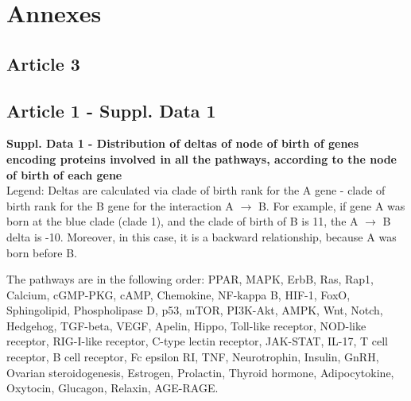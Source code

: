 \chapter[Annexes]{Annexes}
\thispagestyle{firstpage}

\minitoc
\newpage

\section{Article 3}\label{article3}


\section{Article 1 - Suppl. Data 1}
\textbf{Suppl. Data 1 - Distribution of deltas of node of birth of genes encoding proteins involved in all the pathways, according to the node of birth of each gene}\\
Legend: Deltas are calculated via clade of birth rank for the A gene - clade of birth rank for the B gene for the interaction A $\rightarrow$ B. For example, if gene A was born at the blue clade (clade 1), and the clade of birth of B is 11, the A $\rightarrow$ B delta is -10. Moreover, in this case, it is a backward relationship, because A was born before B.
\par The pathways are in the following order:
PPAR, MAPK, ErbB, Ras, Rap1, Calcium, cGMP-PKG, cAMP, Chemokine, NF-kappa B, HIF-1, FoxO, Sphingolipid, Phospholipase D, p53,  mTOR, PI3K-Akt, AMPK, Wnt, Notch, Hedgehog, TGF-beta, VEGF, Apelin, Hippo, Toll-like receptor, NOD-like receptor, RIG-I-like receptor, C-type lectin receptor, JAK-STAT, IL-17, T cell receptor, B cell receptor, Fc epsilon RI, TNF, Neurotrophin, Insulin, GnRH, Ovarian steroidogenesis, Estrogen, Prolactin, Thyroid hormone, Adipocytokine, Oxytocin, Glucagon, Relaxin, AGE-RAGE.



